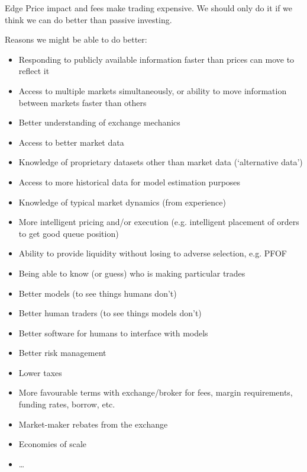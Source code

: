 \documentclass{beamer}
\begin{document}
\begin{frame}{Edge}
	Price impact and fees make trading expensive. We should only do it if we think we can do better than passive investing.

	Reasons we might be able to do better:
	\begin{itemize}
		\item Responding to publicly available information faster than prices can move to reflect it
		\item Access to multiple markets simultaneously, or ability to move information between markets faster than others%
		\item Better understanding of exchange mechanics
		\item Access to better market data
		\item Knowledge of proprietary datasets other than market data (`alternative data')
		\item Access to more historical data for model estimation purposes
		\item Knowledge of typical market dynamics (from experience)
		\item More intelligent pricing and/or execution (e.g. intelligent placement of orders to get good queue position)
		\item Ability to provide liquidity without losing to adverse selection, e.g. PFOF
		\item Being able to know (or guess) who is making particular trades
		\item Better models (to see things humans don't)
		\item Better human traders (to see things models don't)
		\item Better software for humans to interface with models
		\item Better risk management
		\item Lower taxes
		\item More favourable terms with exchange/broker for fees, margin requirements, funding rates, borrow, etc.
		\item Market-maker rebates from the exchange
		\item Economies of scale
		\item \ldots
	\end{itemize}
\end{frame}
\end{document}
